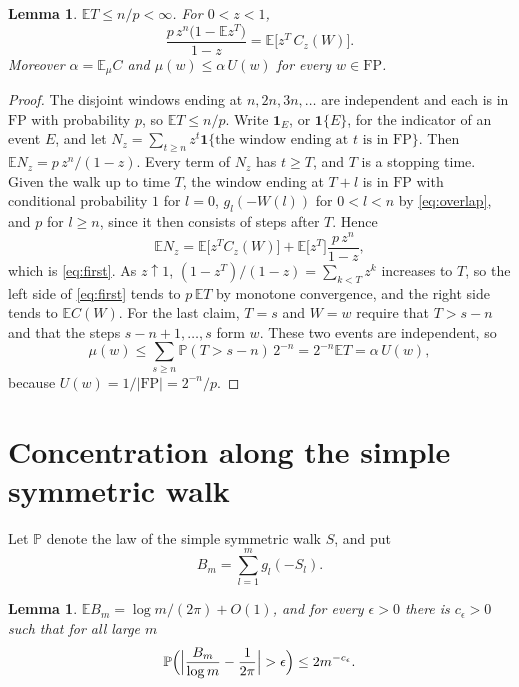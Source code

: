 \documentclass[11pt]{amsart}
\newtheorem{lemma}[theorem]{Lemma}
\theoremstyle{remark}
\numberwithin{equation}{section}
\newcommand{\PP}{\mathbb{P}}
\newcommand{\EE}{\mathbb{E}}
\newcommand{\FP}{\mathrm{FP}}
\begin{document}
\begin{lemma}\label{lem:first}
$\EE T\le n/p<\infty$. For $0<z<1$,
\begin{equation}\label{eq:first}
\frac{p\,z^n\bigl(1-\EE z^T\bigr)}{1-z}=\EE\bigl[z^T\,C_z(W)\bigr].
\end{equation}
Moreover $\alpha=\EE_\mu C$ and $\mu(w)\le\alpha\,U(w)$ for every $w\in\FP$.
\end{lemma}

\begin{proof}
The disjoint windows ending at $n,2n,3n,\dots$ are independent and each is in $\FP$ with probability $p$, so $\EE T\le n/p$. Write $\mathbf 1_E$, or $\mathbf 1\{E\}$, for the indicator of an event $E$, and let $N_z=\sum_{t\ge n}z^t\mathbf 1\{\text{the window ending at $t$ is in }\FP\}$. Then $\EE N_z=p\,z^n/(1-z)$. Every term of $N_z$ has $t\ge T$, and $T$ is a stopping time. Given the walk up to time $T$, the window ending at $T+l$ is in $\FP$ with conditional probability $1$ for $l=0$, $g_l(-W(l))$ for $0<l<n$ by \eqref{eq:overlap}, and $p$ for $l\ge n$, since it then consists of steps after $T$. Hence
\[
\EE N_z=\EE\bigl[z^TC_z(W)\bigr]+\EE\bigl[z^T\bigr]\frac{p\,z^n}{1-z},
\]
which is \eqref{eq:first}. As $z\uparrow1$, $(1-z^T)/(1-z)=\sum_{k<T}z^k$ increases to $T$, so the left side of \eqref{eq:first} tends to $p\,\EE T$ by monotone convergence, and the right side tends to $\EE C(W)$. For the last claim, $T=s$ and $W=w$ require that $T>s-n$ and that the steps $s-n+1,\dots,s$ form $w$. These two events are independent, so
\[
\mu(w)\le\sum_{s\ge n}\PP(T>s-n)\,2^{-n}=2^{-n}\EE T=\alpha\,U(w),
\]
because $U(w)=1/|\FP|=2^{-n}/p$.
\end{proof}

\section{Concentration along the simple symmetric walk}\label{sec:conc}

Let $\PP$ denote the law of the simple symmetric walk $S$, and put
\[
B_m=\sum_{l=1}^mg_l(-S_l).
\]

\begin{lemma}\label{lem:conc}
$\EE B_m=\log m/(2\pi)+O(1)$, and for every $\epsilon>0$ there is $c_\epsilon>0$ such that for all large $m$
\begin{equation}\label{eq:conc}
\PP\Bigl(\Bigl|\frac{B_m}{\log m}-\frac1{2\pi}\Bigr|>\epsilon\Bigr)\le2m^{-c_\epsilon}.
\end{equation}
\end{lemma}
\end{document}
